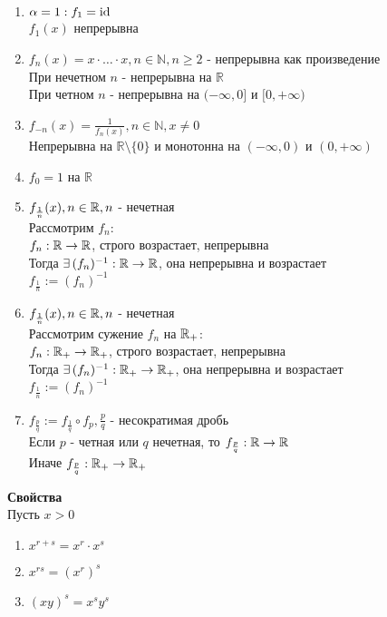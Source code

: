 \documentclass[12pt]{article}
\begin{document}
\begin{enumerate}
    \item $\alpha = 1: f_1 = \operatorname{id}$\\
    $f_1(x)$ непрерывна
    \item $f_n(x) = x\cdot \ldots\cdot x, n \in \mathbb{N}, n \geq 2$ - непрерывна как произведение\\
    При нечетном $n$ - непрерывна на $\mathbb{R}$\\
    При четном $n$ - непрерывна на $(-\infty, 0]$ и $[0, +\infty)$
    \item $f_{-n}(x) = \frac1{f_n(x)}, n \in \mathbb{N}, x \neq 0$\\
    Непрерывна на $\mathbb{R}\setminus\{0\}$ и монотонна на $(-\infty, 0)$ и $(0, +\infty)$
    \item $f_0 = 1$ на $\mathbb{R}$
    \item $f_\frac1n (x), n \in \mathbb{R}, n$ - нечетная\\
    Рассмотрим $f_n$:\\
    $f_n:\mathbb{R} \rightarrow \mathbb{R}$, строго возрастает, непрерывна\\
    Тогда $\exists\,(f_n)^{-1}: \mathbb{R} \rightarrow \mathbb{R}$, она непрерывна и возрастает\\
    $f_\frac1n := (f_n)^{-1}$
    \item $f_\frac1n (x), n \in \mathbb{R}, n$ - нечетная\\
    Рассмотрим сужение $f_n$ на $\mathbb{R_+}$:\\
    $f_n:\mathbb{R}_+ \rightarrow \mathbb{R}_+$, строго возрастает, непрерывна\\
    Тогда $\exists\,(f_n)^{-1}: \mathbb{R}_+ \rightarrow \mathbb{R}_+$, она непрерывна и возрастает\\
    $f_\frac1n := (f_n)^{-1}$
    \item $f_\frac pq := f_\frac1q\circ f_p, \frac pq$ - несократимая дробь\\
    Если $p$ - четная или $q$ нечетная, то $f_\frac pq: \mathbb{R} \rightarrow \mathbb{R}$\\
    Иначе $f_\frac pq: \mathbb{R}_+ \rightarrow \mathbb{R}_+$
\end{enumerate}
\textbf{Свойства}\\
Пусть $x>0$
\begin{enumerate}
    \item $x^{r+s} = x^r\cdot x^s$
    \item $x^{rs}= (x^r)^s$
    \item $(xy)^s=x^sy^s$
\end{enumerate}
\end{document}
